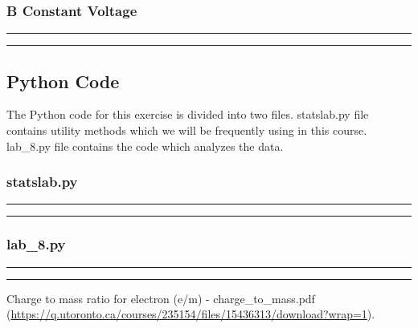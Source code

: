 \documentclass[a4paper,12pt]{article}
\begin{document}
\subsubsection*{B Constant Voltage}

\noindent\rule{\textwidth}{1pt}

\noindent\rule{\textwidth}{1pt}

\pagebreak

\subsection{Python Code}

The Python code for this exercise is divided into two files. statslab.py file contains utility methods
which we will be frequently using in this course. lab\_8.py file contains the code which analyzes
the data.

\subsubsection{statslab.py}
\noindent\rule{\textwidth}{1pt}

\noindent\rule{\textwidth}{1pt}

\pagebreak

\subsubsection{lab\_8.py}
\noindent\rule{\textwidth}{1pt}

\noindent\rule{\textwidth}{1pt}


\pagebreak

\begin{thebibliography}{99}

 Charge to mass ratio for electron (e/m) - charge\_to\_mass.pdf (\url{https://q.utoronto.ca/courses/235154/files/15436313/download?wrap=1}).

\end{thebibliography}
  
  
\end{document}
